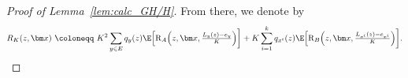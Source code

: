 \begin{refsegment}
\begin{proof}[Proof of Lemma~\ref{lem:calc_GH/H}]
  From there, we denote by
\[
R_K(z,\bm x)\ \coloneqq\ K^2 \sum_{y\in E}q_y(z)\E\Big[\mathrm{R}_A\Big(z, \bm x, \tfrac{L_y(z)-e_y}{K}\Big)\bigg]  + K\sum_{i=1}^k q_{x^i}(z) \E\Big[ \mathrm{R}_B\Big(z, \bm x, \tfrac{L_{x^i}(z)-e_{x^i}}{K}\Big)\bigg].
\]
\end{proof}
\end{refsegment}
